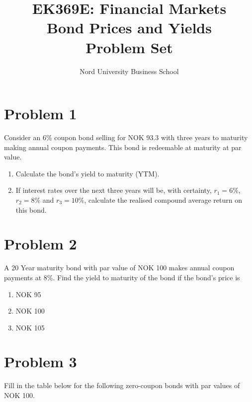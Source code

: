 \documentclass[12]{article}
\title{EK369E: Financial Markets\\ Bond Prices and Yields\\ Problem Set}
\author{Nord University Business School}
\date{}
\begin{document}
\maketitle

\color{black}
\section*{Problem 1}
Consider an 6\% coupon bond selling for NOK 93.3 with three years to maturity making annual coupon payments. This bond is redeemable at maturity at par value.
\begin{enumerate}
    \item[a)] Calculate the bond’s yield to maturity (YTM). 
    \item[b)] If interest rates over the next three years will be, with certainty, $r_1 = 6\%$, $r_2 = 8\%$ and $r_3 = 10\%$, calculate the realised compound average return on this bond.
\end{enumerate}





\color{black}
\section*{Problem 2}
A 20 Year maturity bond with par value of NOK 100 makes annual coupon payments at 8\%. Find the yield to maturity of the bond if the bond's price is
\begin{enumerate}
    \item[a)] NOK 95
    \item[b)] NOK 100
    \item[c)] NOK 105
\end{enumerate}



\color{black}
\section*{Problem 3}
Fill in the table below for the following zero-coupon bonds with par values of NOK 100.

\begin{table}[H]
    \centering
    \label{tab:my_label}
\end{table}
\end{document}
